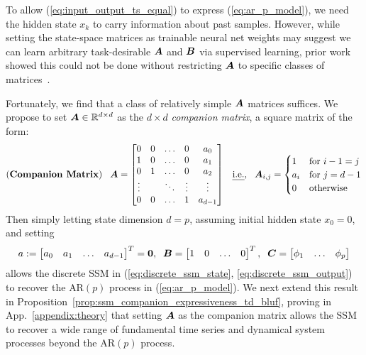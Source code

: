 To allow (\ref{eq:input_output_ts_equal}) to express (\ref{eq:ar_p_model}), we need the hidden state $x_{k}$ to carry information about past samples.
However, while setting the state-space matrices as trainable neural net weights may suggest we can learn arbitrary task-desirable $\boldsymbol{A}$ and $\boldsymbol{B}$ via supervised learning, prior work showed this could not be done without restricting $\boldsymbol{A}$ to specific classes of matrices~\citep{gu2021combining, gupta2022diagonal}.  

Fortunately, we find that a class of relatively simple $\boldsymbol{A}$ matrices suffices. We propose to set $\boldsymbol{A} \in \mathbb{R}^{d \times d}$ as the $d \times d$ \emph{companion matrix}, a square matrix of the form:
\begin{equation}
    (\textbf{Companion Matrix})
    \;\;\;
    \boldsymbol{A} = 
    \begin{bmatrix}
    0  & 0  & \ldots & 0 & a_{0} \\
    1 & 0  &\ldots & 0 & a_{1} \\ 
    0 & 1 & \ldots & 0 & a_{2} \\
    \vdots &    & \ddots  & \vdots  & \vdots \\
    0 & 0  & \ldots & 1 & a_{d - 1} \\
    \end{bmatrix}
    \;\;\;
    \text{\emph{i.e.},{}}
    \;\;\;
    \boldsymbol{A}_{i, j} = 
    \begin{cases}
    1 & \text{for } i - 1 = j\\
    a_i & \text{for } j = d - 1\\
    0 & \text{otherwise}
    \end{cases}
\label{eq:companion_matrix}
\end{equation}
Then simply letting state dimension $d = p$, assuming initial hidden state $x_0 = 0$, and setting 
\[
a := 
\begin{bmatrix}
a_0 & a_1 & \ldots & a_{d-1}
\end{bmatrix}^T
= \boldsymbol{0}, 
\;\; 
\boldsymbol{B} = 
\begin{bmatrix}
1 & 0 & \ldots & 0
\end{bmatrix}^T, 
\;\; 
\boldsymbol{C} = 
\begin{bmatrix}
\phi_1 & \ldots & \phi_p
\end{bmatrix}
\]
allows the discrete SSM in (\ref{eq:discrete_ssm_state}, \ref{eq:discrete_ssm_output}) to recover the $\text{AR}(p)$ process in (\ref{eq:ar_p_model}). 
%
We next extend this result in Proposition~\ref{prop:ssm_companion_expressiveness_td_bluf}, proving in App.~\ref{appendix:theory} that setting $\boldsymbol{A}$ as the companion matrix allows the SSM to recover a wide range of fundamental time series and dynamical system processes beyond the $\text{AR}(p)$ process.
%

